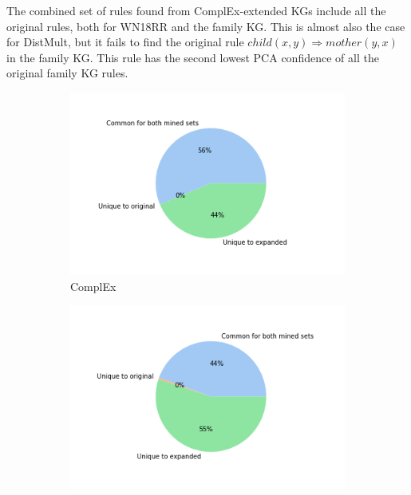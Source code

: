 The combined set of rules found from ComplEx-extended KGs include all the original rules, both for WN18RR and the family KG.  This is almost also the case for DistMult, but it fails to find the original rule $child(x, y) \Rightarrow mother(y,x)$ in the family KG. This rule has the second lowest PCA confidence of all the original family KG rules.


    \begin{figure}[h]
        \centering
        \begin{subfigure}[b]{0.49\textwidth}
            \centering
            \includegraphics[width=\textwidth]{figures/results/pie_charts-model/complEx_family.png}
            \caption[complEx_pie]%
            {{\small ComplEx}}    
            \label{fig:complex_pie_family}
        \end{subfigure}
        \hfill
        \begin{subfigure}[b]{0.49\textwidth}  
            \centering 
            \includegraphics[width=\textwidth]{figures/results/pie_charts-model/distMult_family.png}

\end{subfigure}
\end{figure}
